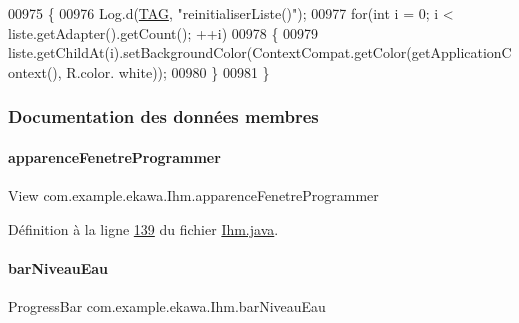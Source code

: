 \begin{DoxyCode}
00975     \{
00976         Log.d(\hyperlink{classcom_1_1example_1_1ekawa_1_1_ihm_a95cd92c2acaf9f8982302da08d94f9aa}{TAG}, \textcolor{stringliteral}{"reinitialiserListe()"});
00977         \textcolor{keywordflow}{for}(\textcolor{keywordtype}{int} i = 0; i < liste.getAdapter().getCount(); ++i)
00978         \{
00979             liste.getChildAt(i).setBackgroundColor(ContextCompat.getColor(getApplicationContext(), R.color.
      white));
00980         \}
00981     \}
\end{DoxyCode}


\subsubsection{Documentation des données membres}
\mbox{\label{classcom_1_1example_1_1ekawa_1_1_ihm_aa8beb9a05b4f2c2030b9829642f87d3f}} 
\paragraph{\texorpdfstring{apparence\+Fenetre\+Programmer}{apparenceFenetreProgrammer}}
{\footnotesize\ttfamily View com.\+example.\+ekawa.\+Ihm.\+apparence\+Fenetre\+Programmer\hspace{0.3cm}{\ttfamily [private]}}



Définition à la ligne \hyperlink{_ihm_8java_source_l00139}{139} du fichier \hyperlink{_ihm_8java_source}{Ihm.\+java}.

\mbox{\label{classcom_1_1example_1_1ekawa_1_1_ihm_a9023d37b98385b21d2b5dd6910c13020}} 
\paragraph{\texorpdfstring{bar\+Niveau\+Eau}{barNiveauEau}}
{\footnotesize\ttfamily Progress\+Bar com.\+example.\+ekawa.\+Ihm.\+bar\+Niveau\+Eau\hspace{0.3cm}{\ttfamily [private]}}



